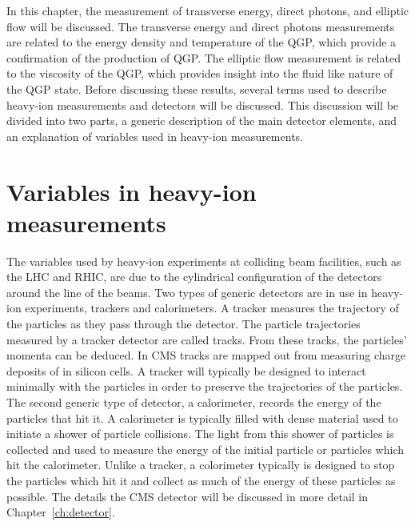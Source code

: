   In this chapter, the measurement of transverse energy, direct photons, and
    elliptic flow will be discussed.
  The transverse energy and direct photons measurements are related to 
    the energy density and temperature of the QGP, which provide a 
    confirmation of the production of QGP.
  The elliptic flow measurement is related to the viscosity of the QGP, which
    provides insight into the fluid like nature of the QGP state.
  Before discussing these results, several terms used to describe heavy-ion
    measurements and detectors will be discussed. 
  This discussion will be divided into two parts, a generic description of 
    the main detector elements, and an explanation of variables used in
    heavy-ion measurements.
  
  \section{Variables in heavy-ion measurements}
    The variables used by heavy-ion experiments at colliding beam facilities, 
      such as the LHC and RHIC, are due to the cylindrical configuration of 
      the detectors around the line of the beams.
    Two types of generic detectors are in use in heavy-ion experiments, 
      trackers and calorimeters. 
    A tracker measures the trajectory of the particles as they pass through 
      the detector.
    The particle trajectories measured by a tracker detector are called 
      tracks.
    From these tracks, the particles' momenta can be deduced. 
    In CMS tracks are mapped out from measuring charge deposits of in silicon
      cells.
    A tracker will typically be designed to interact minimally with the 
      particles in order to preserve the trajectories of the particles. 
    The second generic type of detector, a calorimeter, records the energy 
      of the particles that hit it. 
    A calorimeter is typically filled with dense material used to initiate a 
      shower of particle collisions.
    The light from this shower of particles is collected and used to measure 
      the energy of the initial particle or particles which hit the 
      calorimeter.
    Unlike a tracker, a colorimeter typically is designed to stop the particles
      which hit it and collect as much of the energy of these particles as 
      possible.
    The details the CMS detector will be discussed in more detail in 
     Chapter~\ref{ch:detector}.

